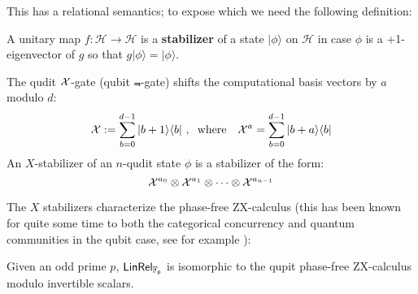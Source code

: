 This has a relational semantics; to expose which we need the following definition:
\begin{definition}
A unitary map $f:\mathcal{H}\to \mathcal{H}$ is a {\bf stabilizer} of a state $|\phi\rangle$ on $\mathcal H$ in case $\phi$ is a +1-eigenvector of $g$ so that $g| \phi\rangle = |\phi \rangle$.


The qudit ${\cal X}$-gate (qubit $\Not$-gate)  shifts the computational basis vectors by $a$ modulo $d$:
$$
{\cal X} := \sum_{b=0}^{d-1} | b+1\rangle \langle b|
\ , \hspace*{.2cm} \text{where \ \ }
{\cal X}^a = \sum_{b=0}^{d-1} | b+a\rangle \langle b|
$$
An $X$-stabilizer of an $n$-qudit state $\phi$ is a stabilizer of the form:
$$
{\cal X}^{a_0}\otimes  {\cal X}^{a_1} \otimes \cdots \otimes {\cal X}^{a_{n-1}}
$$
\end{definition}
The $X$ stabilizers characterize the phase-free ZX-calculus (this has been known for quite some time to both the categorical concurrency and quantum communities in the qubit case, see for example \cite[Page 8]{ih}):
\begin{lemma}
Given an odd prime $p$, $\sf LinRel_{\mathbb{F}_p}$ is isomorphic to the qupit phase-free ZX-calculus modulo invertible scalars.
\end{lemma}
